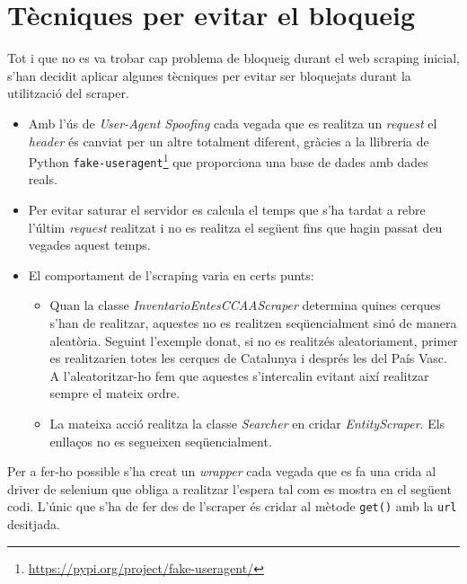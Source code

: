 \documentclass[12pt]{article}
\begin{document}
\section*{Tècniques per evitar el bloqueig}
Tot i que no es va trobar cap problema de bloqueig durant el web scraping inicial, s'han decidit aplicar algunes tècniques per evitar ser bloquejats durant la utilització del scraper.
\begin{itemize}
    \item Amb l'ús de \textit{User-Agent Spoofing} cada vegada que es realitza un \textit{request} el \textit{header} és canviat per un altre totalment diferent, gràcies a la llibreria de Python \texttt{fake-useragent}\footnote{\url{https://pypi.org/project/fake-useragent/}} que proporciona una base de dades amb dades reals.
    \item Per evitar saturar el servidor es calcula el temps que s'ha tardat a rebre l'últim \textit{request} realitzat i no es realitza el següent fins que hagin passat deu vegades aquest temps.
    \item El comportament de l'scraping varia en certs punts:
    \begin{itemize}
        \item Quan la classe \textit{InventarioEntesCCAAScraper} determina quines cerques s'han de realitzar, aquestes no es realitzen seqüencialment sinó de manera aleatòria. Seguint l'exemple donat, si no es realitzés aleatoriament, primer es realitzarien totes les cerques de Catalunya i després les del País Vasc. A l'aleatoritzar-ho fem que aquestes s'intercalin evitant així realitzar sempre el mateix ordre.
        \item La mateixa acció realitza la classe \textit{Searcher} en cridar \textit{EntityScraper}. Els enllaços no es segueixen seqüencialment.
    \end{itemize}
\end{itemize}

Per a fer-ho possible s'ha creat un \textit{wrapper} cada vegada que es fa una crida al driver de selenium que obliga a realitzar l'espera tal com es mostra en el següent codi. L'únic que s'ha de fer des de l'scraper és cridar al mètode \texttt{get()} amb la \texttt{url} desitjada.
\end{document}
